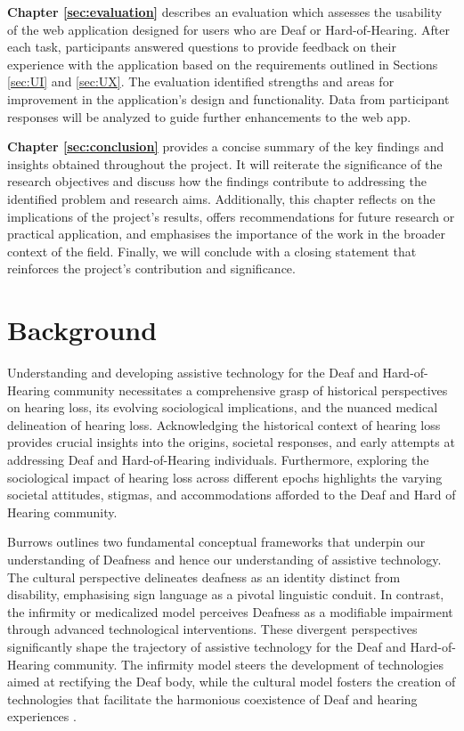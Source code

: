 \documentclass{l4proj}
\begin{document}
\textbf{Chapter \ref{sec:evaluation}} describes an evaluation which assesses the usability of the web application designed for users who are Deaf or Hard-of-Hearing. After each task, participants answered questions to provide feedback on their experience with the application based on the requirements outlined in Sections \ref{sec:UI} and \ref{sec:UX}. The evaluation identified strengths and areas for improvement in the application's design and functionality. Data from participant responses will be analyzed to guide further enhancements to the web app.

\textbf{Chapter \ref{sec:conclusion}} provides a concise summary of the key findings and insights obtained throughout the project. It will reiterate the significance of the research objectives and discuss how the findings contribute to addressing the identified problem and research aims. Additionally, this chapter reflects on the implications of the project's results, offers recommendations for future research or practical application, and emphasises the importance of the work in the broader context of the field. Finally, we will conclude with a closing statement that reinforces the project's contribution and significance.

\chapter{Background}
\label{sec:background}

Understanding and developing assistive technology for the Deaf and Hard-of-Hearing community necessitates a comprehensive grasp of historical perspectives on hearing loss, its evolving sociological implications, and the nuanced medical delineation of hearing loss. Acknowledging the historical context of hearing loss provides crucial insights into the origins, societal responses, and early attempts at addressing Deaf and Hard-of-Hearing individuals. Furthermore, exploring the sociological impact of hearing loss across different epochs highlights the varying societal attitudes, stigmas, and accommodations afforded to the Deaf and Hard of Hearing community.

Burrows outlines two fundamental conceptual frameworks that underpin our understanding of Deafness and hence our understanding of assistive technology. The cultural perspective delineates deafness as an identity distinct from disability, emphasising sign language as a pivotal linguistic conduit. In contrast, the infirmity or medicalized model perceives Deafness as a modifiable impairment through advanced technological interventions. These divergent perspectives significantly shape the trajectory of assistive technology for the Deaf and Hard-of-Hearing community. The infirmity model steers the development of technologies aimed at rectifying the Deaf body, while the cultural model fosters the creation of technologies that facilitate the harmonious coexistence of Deaf and hearing experiences \citep{burrows2022not}.
\end{document}
